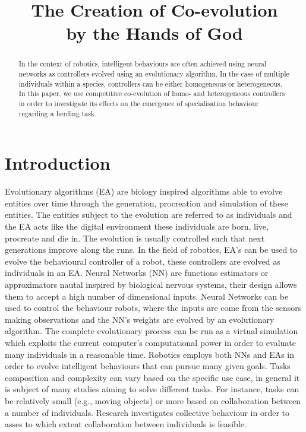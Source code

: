 \documentclass[conference]{IEEEtran}
\begin{document}
\title{The Creation of Co-evolution \\ by the Hands of God}



\author{
}



\maketitle


\begin{abstract}
In the context of robotics, intelligent behaviours are often achieved using neural networks as controllers evolved using  an evolutionary algorithm.
In the case of multiple individuals within a species, controllers can be either homogeneous or heterogeneous.
In this paper, we use competitive co-evolution of homo- and heterogeneous controllers in order to investigate its effects on the emergence of specialisation behaviour regarding a herding task.
\end{abstract}


\IEEEpeerreviewmaketitle


\section{Introduction}
Evolutionary algorithms (EA) are biology inspired algorithms able to evolve entities over time through the generation, procreation and simulation of these entities. The entities subject to the evolution are referred to as individuals and the EA acts like the digital environment these individuals are born, live, procreate and die in.
The evolution is usually controlled such that next generations improve along the runs.
In the field of robotics, EA's can be used to evolve the behavioural controller of a robot, these controllers are evolved as individuals in an EA.
Neural Networks (NN) are functions estimators or approximators nautal inspired by biological nervous systems, their design allows them to accept a high number of dimensional inputs.   
Neural Networks can be used to control the behaviour robots, where the inputs are come from the sensors making observations and the NN's weights are evolved by an evolutionary algorithm.
The complete evolutionary process can be run as a virtual simulation which exploits the current computer's computational power in order to evaluate many individuals in a reasonable time.
Robotics employs both NNs and EAs in order to evolve intelligent behaviours that can pursue many given goals.
Tasks composition and complexity can vary based on the specific use case, in general it is subject of many studies aiming to solve different tasks.
For instance, tasks can be relatively small (e.g., moving objects) or more based on collaboration between a number of individuals.
Research investigates collective behaviour in order to asses to which extent collaboration between individuals is feasible.  
\end{document}
